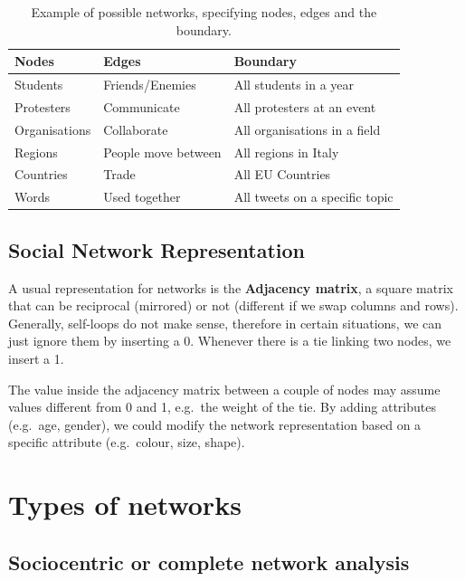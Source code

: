\documentclass[
  notitlepage,
  onecolumn,
  openany]{book}
\begin{document}
\begin{table}[h!]
\centering
\begin{tabular}{@{}lll@{}}
\toprule
\textbf{Nodes} & \textbf{Edges}      & \textbf{Boundary}              \\ \midrule
Students       & Friends/Enemies     & All students in a year         \\
Protesters     & Communicate         & All protesters at an event     \\
Organisations  & Collaborate         & All organisations in a field   \\
Regions        & People move between & All regions in Italy           \\
Countries      & Trade               & All EU Countries               \\
Words          & Used together       & All tweets on a specific topic \\ \bottomrule
\end{tabular}
\caption{Example of possible networks, specifying nodes, edges and the boundary. }
\label{tab:network_example}
\end{table}

\hypertarget{social-network-representation}{%
\subsection{Social Network Representation}\label{social-network-representation}}

A usual representation for networks is the \textbf{Adjacency matrix}, a square matrix that can be reciprocal (mirrored) or not (different if we swap columns and rows). Generally, self-loops do not make sense, therefore in certain situations, we can just ignore them by inserting a 0. Whenever there is a tie linking two nodes, we insert a 1.

The value inside the adjacency matrix between a couple of nodes may assume values different from 0 and 1, e.g.~the weight of the tie. By adding attributes (e.g.~age, gender), we could modify the network representation based on a specific attribute (e.g.~colour, size, shape).

\hypertarget{types-of-networks}{%
\section{Types of networks}\label{types-of-networks}}

\hypertarget{sociocentric-or-complete-network-analysis}{%
\subsection{Sociocentric or complete network analysis}\label{sociocentric-or-complete-network-analysis}}
\end{document}
